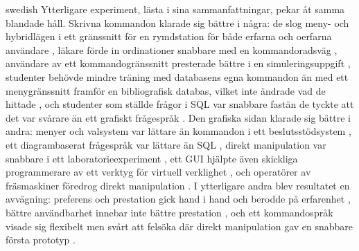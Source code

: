 \begin{onlyin}{swedish}
Ytterligare experiment, lästa i sina sammanfattningar, pekar åt samma
blandade håll.  Skrivna kommandon klarade sig bättre i några: de slog
meny- och hybridlägen i ett gränssnitt för en rymdstation för både
erfarna och oerfarna användare \autocite{Antin1986Evaluation}, läkare
förde in ordinationer snabbare med en kommandoradsväg
\autocite{Lovis2001Evaluation}, användare av ett kommandogränssnitt
presterade bättre i en simuleringsuppgift \autocite{Schar1997Effect},
studenter behövde mindre träning med databasens egna kommandon än med
ett
menygränssnitt framför en bibliografisk databas, vilket inte ändrade vad
de hittade \autocite{Sullivan1990End}, och studenter som ställde frågor
i SQL var snabbare fastän de tyckte att det var svårare än ett grafiskt
frågespråk \autocite{Jones1996Articulating}.  Den grafiska sidan klarade
sig bättre i andra: menyer och valsystem var lättare än kommandon i ett
beslutsstödsystem \autocite{Waring1992Factors}, ett diagrambaserat
frågespråk var lättare än SQL \autocite{Catarci1995Diagrammatic}, direkt
manipulation var snabbare i ett laboratorieexperiment
\autocite{Lee2008Effects}, ett GUI hjälpte även skickliga programmerare
av ett verktyg för virtuell verklighet \autocite{Fellmann2007Command},
och operatörer av fräsmaskiner föredrog direkt manipulation
\autocite{TorresChazaro1992Design}.  I ytterligare andra blev resultatet
en avvägning: preferens och prestation gick hand i hand och berodde på
erfarenhet \autocite{Kissel1997Influence}, bättre användbarhet innebar
inte bättre prestation \autocite{Chhanabhai2004First}, och ett
kommandospråk visade sig flexibelt men svårt att felsöka där direkt
manipulation gav en snabbare första prototyp
\autocite{Kjeldskov2008Interaction}.


\end{onlyin}
